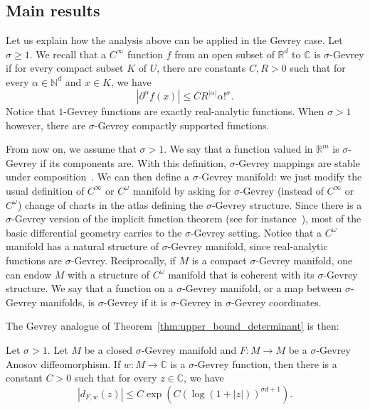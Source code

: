 \documentclass[AHL,Unicode,longabstracts,published]{cedram}
\newcommand{\p}[1]{\left(#1\right)}
\newcommand{\va}[1]{\left|#1\right|}
\newcommand{\bbC}{\mathbb{C}}
\newcommand{\bbN}{\mathbb{N}}
\newcommand{\bbR}{\mathbb{R}}
\begin{document}
\subsection{Main results}

Let us explain how the analysis above can be applied in the Gevrey case. Let $\sigma \geq 1$. We recall that a $C^\infty$ function $f$ from an open subset of $\bbR^d$ to $\bbC$ is $\sigma$-Gevrey if for every compact subset $K$ of $U$, there are constants $C,R > 0$ such that for every $\alpha \in \bbN^d$ and $x \in K$, we have
\begin{equation*}
\va{\partial^\alpha f(x)} \leq C R^{\va{\alpha}} \alpha!^\sigma.
\end{equation*}
Notice that $1$-Gevrey functions are exactly real-analytic functions. When $\sigma > 1$ however, there are $\sigma$-Gevrey compactly supported functions.

From now on, we assume that $\sigma > 1$. We say that a function valued in $\bbR^m$ is $\sigma$-Gevrey if its components are. With this definition, $\sigma$-Gevrey mappings are stable under composition~\cite{GevreyOG}. We can then define a $\sigma$-Gevrey manifold: we just modify the usual definition of $C^\infty$ or $C^\omega$ manifold by asking for $\sigma$-Gevrey (instead of $C^\infty$ or $C^\omega$) change of charts in the atlas defining the $\sigma$-Gevrey structure. Since there is a $\sigma$-Gevrey version of the implicit function theorem (see for instance~\cite{komatsu_implicit}), most of the basic differential geometry carries to the $\sigma$-Gevrey setting. Notice that a $C^\omega$ manifold has a natural structure of $\sigma$-Gevrey manifold, since real-analytic functions are $\sigma$-Gevrey. Reciprocally, if $M$ is a compact $\sigma$-Gevrey manifold, one can endow $M$ with a structure of $C^\omega$ manifold that is coherent with its $\sigma$-Gevrey structure. We say that a function on a $\sigma$-Gevrey manifold, or a map between $\sigma$-Gevrey manifolds, is $\sigma$-Gevrey if it is $\sigma$-Gevrey in $\sigma$-Gevrey coordinates.

The Gevrey analogue of Theorem~\ref{thm:upper_bound_determinant} is then:

\begin{theo}\label{theorem:gevrey_determinant}
Let $\sigma > 1$. Let $M$ be a closed $\sigma$-Gevrey manifold and $F : M \to M$ be a $\sigma$-Gevrey Anosov diffeomorphism. If $w :M \to \bbC$ is a $\sigma$-Gevrey function, then there is a constant $C > 0$ such that for every $z \in \bbC$, we have
\begin{equation*}
\va{d_{F,w}(z)} \leq C\exp\p{C\p{\log(1 + \va{z})}^{\sigma d+1}}.
\end{equation*}
\end{theo}
\end{document}
